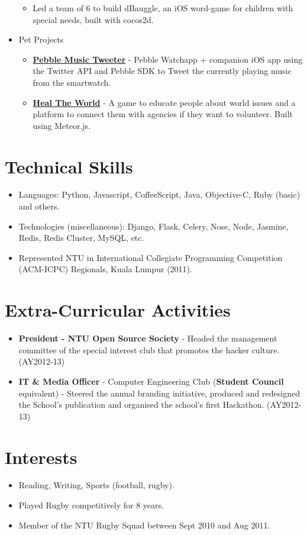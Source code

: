 \begin{itemize}
  \begin{itemize}
  \tightlist
  \item
    Led a team of 6 to build dBauggle, an iOS word-game for children
    with special needs, built with cocos2d.
  \end{itemize}
\item
  Pet Projects

  \begin{itemize}
  \tightlist
  \item
    \href{https://github.com/radzinzki/Pebble-MusicTweeter}{\textbf{Pebble
    Music Tweeter}} - Pebble Watchapp + companion iOS app using the
    Twitter API and Pebble SDK to Tweet the currently playing music from
    the smartwatch.
  \item
    \href{http://healtheworld.meteor.com/}{\textbf{Heal The World}} - A
    game to educate people about world issues and a platform to connect
    them with agencies if they want to volunteer. Built using Meteor.js.
  \end{itemize}
\end{itemize}

\section{Technical Skills}\label{technical-skills}

\begin{itemize}
\tightlist
\item
  Languages: Python, Javascript, CoffeeScript, Java, Objective-C, Ruby
  (basic) and others.
\item
  Technologies (miscellaneous): Django, Flask, Celery, Nose, Node,
  Jasmine, Redis, Redis Cluster, MySQL, etc.
\item
  Represented NTU in International Collegiate Programming Competition
  (ACM-ICPC) Regionals, Kuala Lumpur (2011).
\end{itemize}

\section{Extra-Curricular Activities}\label{extra-curricular-activities}

\begin{itemize}
\tightlist
\item
  \textbf{President - NTU Open Source Society} - Headed the management
  committee of the special interest club that promotes the hacker
  culture. (AY2012-13)
\item
  \textbf{IT \& Media Officer} - Computer Engineering Club
  (\textbf{Student Council} equivalent) - Steered the annual branding
  initiative, produced and redesigned the School's publication and
  organised the school's first Hackathon. (AY2012-13)
\end{itemize}

\section{Interests}\label{interests}

\begin{itemize}
\tightlist
\item
  Reading, Writing, Sports (football, rugby).
\item
  Played Rugby competitively for 8 years.
\item
  Member of the NTU Rugby Squad between Sept 2010 and Aug 2011.
\end{itemize}
